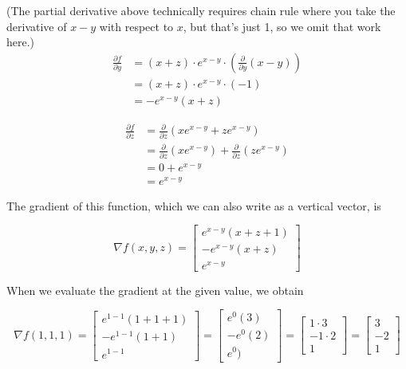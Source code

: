 \documentclass[10pt]{amsart}
\begin{document}
\begin{enumerate}
(The partial derivative above technically requires chain rule where you take the derivative of $x-y$ with respect to $x$, but that's just 1, so we omit that work here.)
\medskip
\begin{align*}
\frac{\partial f}{\partial y} &= (x+z)\cdot e^{x-y} \cdot \left(\frac{\partial}{\partial y} (x-y)\right)\\
&= (x+z) \cdot e^{x-y} \cdot (-1)\\
&= -e^{x-y}(x+z)
\end{align*}
\end{enumerate}

\begin{align*}
\frac{\partial f}{\partial z} &= \frac{\partial}{\partial z} (xe^{x-y} + ze^{x-y}) \\
&= \frac{\partial}{\partial z} (xe^{x-y}) + \frac{\partial}{\partial z} (ze^{x-y}) \\
&= 0 + e^{x-y}\\
&= e^{x-y}
\end{align*}

The gradient of this function, which we can also write as a vertical vector, is

$$\nabla f(x,y,z) = \left[\begin{array}{r} e^{x-y} (x+z+1) \\ -e^{x-y}(x+z) \\ e^{x-y}\end{array}\right]$$

When we evaluate the gradient at the given value, we obtain

$$\nabla f(1,1,1) = \left[\begin{array}{c} e^{1-1} (1+1+1) \\ -e^{1-1}(1+1) \\ e^{1-1}\end{array}\right] = \left[\begin{array}{r} e^0 (3) \\ -e^0 (2) \\ e^0) \end{array}\right] = \left[\begin{array}{r} 1 \cdot 3 \\ -1 \cdot 2 \\ 1\end{array}\right] = \left[\begin{array}{r} 3 \\ -2 \\ 1 \end{array}\right]$$
\end{document}

